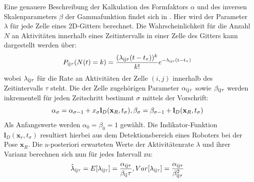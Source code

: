 Eine genauere Beschreibung der Kalkulation des Formfaktors $\alpha$ und des inversen Skalenparameters $\beta$ der Gammafunktion findet sich in \cite{Stuede.2020}. Hier wird der Parameter $\lambda$ für jede Zelle eines 2D-Gitters berechnet. Die Wahrscheinlichkeit
für die Anzahl $N$ an Aktivitäten innerhalb eines Zeitintervalls in einer Zelle des Gitters kann dargestellt werden über:
\begin{equation}
	P_{\mathrm{ij \tau}} (N(t) = k) = \frac{(\lambda_{\mathrm{ij \tau}}(t-t_\tau))^k}{k!} e^{\mathrm{-\lambda_{\mathrm{ij\tau}} (t- t_\tau)}}
\end{equation}
wobei $\lambda_{\mathrm{ij \tau}}$ für die Rate an Aktivitäten der Zelle $(i,j)$ innerhalb des Zeitintervalls $\tau$ steht. Die der Zelle zugehörigen Parameter $\alpha_{\mathrm{ij\tau}}$ sowie $\beta_{\mathrm{ij\tau}}$ werden inkrementell für jeden Zeitschritt bestimmt $\sigma$  mittels der Vorschrift:
\begin{equation}
	\alpha_\sigma = \alpha_{\mathrm{\sigma - 1}} + x_\sigma \mathbf{l}_D (\mathbf{x}_R, t_\sigma),  \beta_\sigma = \beta_{\mathrm{\sigma - 1}} + \mathbf{l}_D (\mathbf{x}_R, t_\sigma )
\end{equation}
Als Anfangswerte werden $\alpha_0 = \beta_0 = 1 $ gewählt. Die Indikator-Funktion $\boldsymbol{l}_D (\boldsymbol{x}_r, t_\sigma)$ resultiert hierbei aus dem Detektionsbereich eines Roboters bei der Pose $\boldsymbol{x}_R$. Die a-posteriori erwarteten Werte der Aktivitätenrate $\lambda$ und ihrer Varianz berechnen sich nun für jedes Intervall zu:
\begin{equation}
	\hat{\lambda}_{\mathrm{ij\tau}} = E[\lambda_{\mathrm{ij\tau}}] = \frac{\alpha_{\mathrm{ij\tau}}}{\beta_{\mathrm{ij}}\tau},	Var[\lambda_{\mathrm{ij\tau}}] = \frac{\alpha_{\mathrm{ij\tau}}}{\beta_{\mathrm{ij\tau}}^2}
\end{equation}


